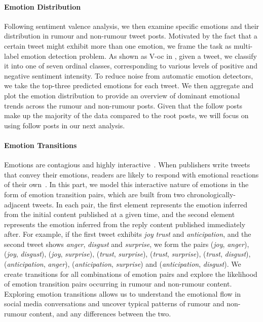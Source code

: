 \paragraph{Emotion Distribution} 
Following sentiment valence analysis, we then examine specific emotions and their distribution in rumour and non-rumour tweet posts.
Motivated by the fact that a certain tweet might exhibit more than one emotion, we frame the task as multi-label emotion detection problem. As shown as V-oc in , given a tweet, we classify it into one of seven ordinal classes, corresponding to various levels of positive and negative sentiment intensity. To reduce noise from automatic emotion detectors, we take the top-three predicted emotions for each tweet. We then aggregate and plot the emotion distribution to provide an overview of dominant emotional trends across the rumour and non-rumour posts. Given that the follow posts make up the majority of the data compared to the root posts, we will focus on using follow posts in our next analysis.

\paragraph{Emotion Transitions} 
Emotions are contagious and highly interactive~\citep{Ferrara_2015}. When publishers write tweets that convey their emotions, readers are likely to respond with emotional reactions of their own~\citep{Ferrara_2015,emotion_dynamics}. In this part, we model this interactive nature of emotions in the form of emotion transition pairs, which are built from two chronologically-adjacent tweets. In each pair, the first element represents the emotion inferred from the initial content published at a given time, and the second element represents the emotion inferred from the reply content published immediately after. For example, if the first tweet exhibits \textit{joy} \textit{trust} and \textit{anticipation}, and the second tweet shows \textit{anger}, \textit{disgust} and \textit{surprise}, we form the pairs (\textit{joy}, \textit{anger}), (\textit{joy}, \textit{disgust}), (\textit{joy}, \textit{surprise}), (\textit{trust}, \textit{surprise}), (\textit{trust}, \textit{surprise}), (\textit{trust}, \textit{disgust}), (\textit{anticipation}, \textit{anger}), (\textit{anticipation}, \textit{surprise}) and (\textit{anticipation}, \textit{disgust}). We create transitions for all combinations of emotion pairs and explore the likelihood of emotion transition pairs occurring in rumour and non-rumour content. Exploring emotion transitions allows us to understand the emotional flow in social media conversations and uncover typical patterns of rumour and non-rumour content, and any differences between the two.

